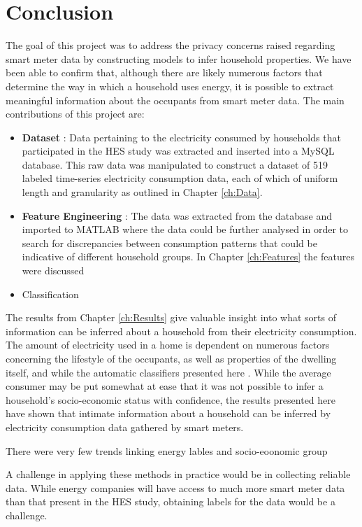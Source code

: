 \chapter{Conclusion}

The goal of this project was to address the privacy concerns raised regarding smart meter data by constructing models to infer household properties. We have been able to confirm that, although there are likely numerous factors that determine the way in which a household uses energy, it is possible to extract meaningful information about the occupants from smart meter data. The main contributions of this project are:

\begin{itemize}

\item \textbf{Dataset} : Data pertaining to the electricity consumed by households that participated in the HES study was extracted and inserted into a MySQL database. This raw data was manipulated to construct a dataset of 519 labeled time-series electricity consumption data, each of which of uniform length and granularity as outlined in Chapter \ref{ch:Data}. 

\item \textbf{Feature Engineering} : The data was extracted from the database and imported to MATLAB where the data could be further analysed in order to search for discrepancies between consumption patterns that could be indicative of different household groups. In Chapter \ref{ch:Features} the features were discussed 

\item Classification
\end{itemize}

The results from Chapter \ref{ch:Results} give valuable insight into what sorts of information can be inferred about a household from their electricity consumption. The amount of electricity used in a home is dependent on numerous factors concerning the lifestyle of the occupants, as well as properties of the dwelling itself, and while the automatic classifiers presented here .  
While the average consumer may be put somewhat at ease that it was not possible to infer a household's socio-economic status with confidence, the results presented here have shown that intimate information about a household can be inferred by electricity consumption data gathered by smart meters. 

There were very few trends linking energy lables and socio-eoonomic group

A challenge in applying these methods in practice would be in collecting reliable data. While energy companies will have access to much more smart meter data than that present in the HES study, obtaining labels for the data would be a challenge.

